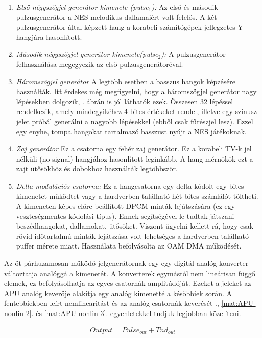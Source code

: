 	\begin{enumerate}
		\item \emph{Első négyszögjel generátor kimenete (pulse$_1$):} Az első és második pulzusgenerátor a NES melodikus dallamaiért volt felelős. A két pulzusgenerátor által képzett hang a korabeli számítógépek jellegzetes Y hangjára hasonlított. 
		\item \emph{Második négyszögjel generátor kimenete(pulse$_2$):} A pulzusgenerátor felhasználása megegyezik az első pulzusgenerátoréval.
		\item \emph{Háromszögjel generátor} A legtöbb esetben a basszus hangok képzésére használták. Itt érdekes még megfigyelni, hogy a háromszögjel generátor nagy lépésekben dolgozik, . ábrán is jól láthatók ezek. Összesen 32 lépéssel rendelkezik, amely mindegyikéhez 4 bites értékeket rendel, illetve egy szinusz jelet próbál generálni a nagyobb lépésekkel (ebből csak fűrészjel lesz). Ezzel egy enyhe, tompa hangokat tartalmazó basszust nyújt a NES játékoknak. 
		\item\emph{Zaj generátor} Ez a csatorna egy fehér zaj generátor. Ez a korabeli TV-k jel nélküli (no-signal) hangjához hasonlított leginkább. A hang mérnökök ezt a zajt ütősökhöz és dobokhoz használták legtöbbször. 
		\item \emph{Delta modulációs csatorna:} Ez a hangcsatorna egy delta-kódolt egy bites kimenetet működtet vagy a hardverben található hét bites számlálót töltheti. A kimeneten képes előre beállított DPCM minták lejátszására (ez egy veszteségmentes kódolási típus). Ennek segítségével le tudtak játszani beszédhangokat, dallamokat, ütősöket. Viszont ügyelni kellett rá, hogy csak rövid időtartalmú minták lejátszása volt lehetséges a hardverben található puffer mérete miatt. Használata befolyásolta az OAM DMA működését.  
	\end{enumerate} 
	
	Az öt párhuzamosan működő jelgenerátornak egy-egy digitál-analóg konverter változtatja analóggá a kimenetét. A konverterek egymástól nem lineárisan függő elemek, ez befolyásolhatja az egyes csatornák amplitúdóját. Ezeket a jeleket az APU analóg keverője alakítja egy analóg kimenetté a későbbiek során. A fentebbiekben leírt nemlinearitást és az analóg csatornák keverését ., \ref{mat:APU-nonlin-2}. és \ref{mat:APU-nonlin-3}. egyenletekkel tudjuk legjobban közelíteni.
	
	\begin{align}
		\label{mat:APU-nonlin-1}	
		Output = Pulse_{out} + Tnd_{out}
	\end{align}
	
